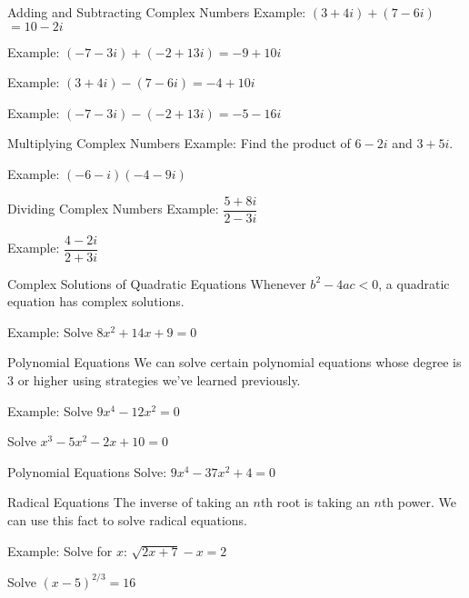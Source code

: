 \documentclass{beamer}
\begin{document}
\begin{frame}[t]{Adding and Subtracting Complex Numbers}
Example: $(3 + 4i) + (7 - 6i)$\pause$=10 - 2i$ \vspace{12pt}

\pause

Example: $(-7 - 3i) + (-2 + 13i)$\pause$= -9 + 10i$ \vspace{12pt}

\pause

Example: $(3 + 4i) - (7 - 6i)$\pause$= -4 + 10i$ \vspace{12pt}

\pause

Example: $(-7 - 3i) - (-2 + 13i)$\pause$= -5 - 16i$
\end{frame}

\begin{frame}[t]{Multiplying Complex Numbers}
Example: Find the product of $6 - 2i$ and $3 + 5i$.

\vfill \pause

Example: $(-6-i)(-4-9i)$
\end{frame}

\begin{frame}[t]{Dividing Complex Numbers}
Example: $\dfrac{5 + 8i}{2 - 3i}$

\vfill \pause

Example: $\dfrac{4 - 2i}{2 + 3i}$
\end{frame}

\begin{frame}[t]{Complex Solutions of Quadratic Equations}
Whenever $b^2 - 4ac < 0$, a quadratic equation has complex solutions.

Example: Solve $8x^2 + 14x + 9 = 0$
\end{frame}

\begin{frame}[t]{Polynomial Equations}
We can solve certain polynomial equations whose degree is 3 or higher using strategies we've learned previously.

Example: Solve $9x^4 - 12x^2 = 0$

\vfill \pause

Solve $x^3 - 5x^2 - 2x + 10 = 0$
\end{frame}

\begin{frame}[t]{Polynomial Equations}
Solve: $9x^4 - 37x^2 + 4 = 0$
\end{frame}

\begin{frame}[t]{Radical Equations}
The inverse of taking an $n$th root is taking an $n$th power. We can use this fact to solve radical equations.

\pause

Example: Solve for $x$: $\sqrt{2x + 7} - x = 2$

\vfill \pause

Solve $(x-5)^{2/3} = 16$
\end{frame}
\end{document}
